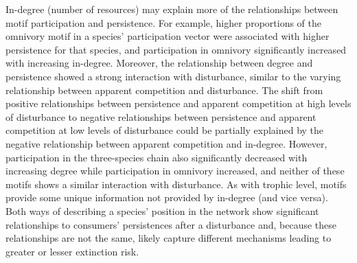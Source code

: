 \documentclass[12pt]{article}
\begin{document}
\begin{spacing}{2.0}
    
    In-degree (number of resources) may explain more of the relationships between motif participation and persistence.
    For example, higher proportions of the omnivory motif in a species' participation vector were associated with higher persistence for that species, and participation in omnivory significantly increased with increasing in-degree.
    Moreover, the relationship between degree and persistence  showed a strong interaction with disturbance, similar to the varying relationship between apparent competition and disturbance. 
    The shift from positive relationships between persistence and apparent competition at high levels of disturbance to negative relationships between persistence and apparent competition at low levels of disturbance could be partially explained by the negative relationship between apparent competition and in-degree.
    However, participation in the three-species chain also significantly decreased with increasing degree while participation in omnivory increased, and neither of these motifs shows a similar interaction with disturbance.
    As with trophic level, motifs provide some unique information not provided by in-degree (and vice versa). 
    Both ways of describing a species' position in the network show significant relationships to consumers' persistences after a disturbance and, because these relationships are not the same, likely capture different mechanisms leading to greater or lesser extinction risk.
    
    
    

\end{spacing}
\end{document}

